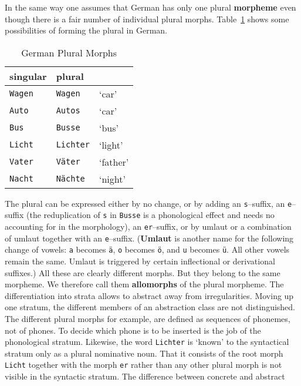 In the same way one assumes that German has only one plural 
\textbf{morpheme}
even though there is a fair number of individual plural morphs.
Table~\ref{tab:gerplur} shows some possibilities of forming the 
plural in German.
\begin{table}
\caption{German Plural Morphs}
\label{tab:gerplur}
\begin{center}
\begin{tabular}{|l|l||l|}
\hline
singular & plural & \\\hline\hline
{\tt Wagen}    & {\tt Wagen}  & `car' \\
{\tt Auto}     & {\tt Autos}  & `car' \\
{\tt Bus}      & {\tt Busse}  &  `bus' \\
{\tt Licht}    & {\tt Lichter}  &  `light' \\
{\tt Vater}    & {\tt V\"ater}  &  `father' \\
{\tt Nacht}    & {\tt N\"achte} &  `night' \\\hline
\end{tabular}
\end{center}
\end{table}
The plural can be expressed either by no change, or by
adding an {\tt s}--suffix, an {\tt e}--suffix (the reduplication of
{\tt s} in {\tt Busse} is  a phonological effect and needs no
accounting for in the morphology), an {\tt er}--suffix, or
by umlaut or a combination of umlaut together with an {\tt e}--suffix.
(\textbf{Umlaut} is another name for the following change of vowels:
{\tt a} becomes {\tt \"a}, {\tt o} becomes {\tt \"o}, and {\tt u} 
becomes {\tt \"u}. All other vowels remain the same. Umlaut is 
triggered by certain inflectional or derivational suffixes.)
All these are clearly different morphs. But they
belong to the same morpheme. We therefore call them \textbf{allomorphs} 
of the plural morpheme. The differentiation into
strata allows to abstract away from irregularities.
Moving up one stratum, the different members of an abstraction
class are not distinguished. The different plural morphs for
example, are defined as sequences of phonemes, not of phones. To
decide which phone is to be inserted is the job of the phonological
stratum. Likewise, the word {\tt Lichter} is `known' to the
syntactical stratum only as a plural nominative noun. That it
consists of the root morph {\tt Licht} together with the morph
{\tt er} rather than any other plural morph is not visible in the
syntactic stratum. The difference between concrete and abstract
